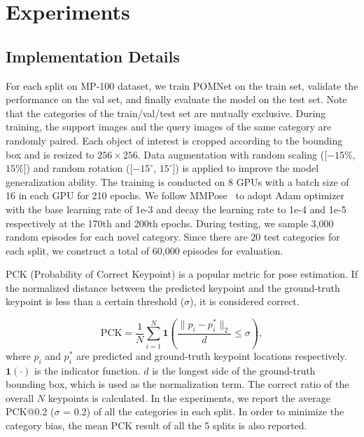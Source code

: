 \documentclass[runningheads]{llncs}
\begin{document}
\section{Experiments}

\subsection{Implementation Details}

For each split on MP-100 dataset, we train POMNet on the train set, validate the performance on the val set, and finally evaluate the model on the test set. Note that the categories of the train/val/test set are mutually exclusive. During training, the support images and the query images of the same category are randomly paired. Each object of interest is cropped according to the bounding box and is resized to $256 \times 256$.
Data augmentation with random scaling ([$-15\%$, $15\%$]) and random rotation ([$-15^{\circ}$, $15^{\circ}$]) is applied to improve the model generalization ability. The training is conducted on 8 GPUs with a batch size of 16 in each GPU for 210 epochs. We follow MMPose~\cite{mmpose2020} to adopt Adam optimizer~\cite{kingma2014adam} with the base learning rate of 1e-3 and decay the learning rate to 1e-4 and 1e-5 respectively at the 170th and 200th epochs. During testing, we sample 3,000 random episodes for each novel category. Since there are 20 test categories for each split, we construct a total of 60,000 episodes for evaluation. 

PCK (Probability of Correct Keypoint) is a popular metric for pose estimation. If the normalized distance between the predicted keypoint and the ground-truth keypoint is less than a certain threshold ($\sigma$), it is considered correct. 

\begin{equation}
    \mathrm{PCK} = \frac{1}{N} \sum_{i=1}^{N} \mathbf{1} \left( \frac{ \lVert p_i - {p}_i^* \rVert_2}{d} \leq \sigma \right),
\end{equation}
where $p_i$ and ${p}_i^*$ are predicted and ground-truth keypoint locations respectively. $\mathbf{1}(\cdot)$ is the indicator function. $d$ is the longest side of the ground-truth bounding box, which is used as the normalization term. The correct ratio of the overall $N$ keypoints is calculated. 
In the experiments, we report the average PCK@0.2 ($\sigma$ = 0.2) of all the categories in each split. In order to minimize the category bias, the mean PCK result of all the 5 splits is also reported. 
\end{document}
